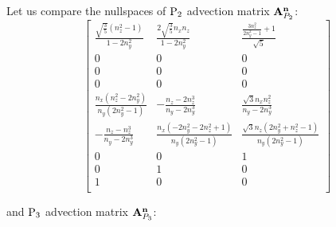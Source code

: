 \begin{remark} 
Let us compare the nullspaces of $\PN[2]$ advection matrix $\mat{A}_{P_2}^{\bn}$: 
$$
\left[
\begin{array}{ccc}
 \frac{\sqrt{\frac{3}{5}} \left(n_z^2-1\right)}{1-2 n_y^2} & \frac{2 \sqrt{\frac{3}{5}} n_x n_z}{1-2 n_y^2} & \frac{\frac{3 n_z^2}{2 n_y^2-1}+1}{\sqrt{5}} \\
 0 & 0 & 0 \\
 0 & 0 & 0 \\
 0 & 0 & 0 \\
 \frac{n_x \left(n_z^2-2 n_y^2\right)}{n_y \left(2 n_y^2-1\right)} & -\frac{n_z-2 n_z^3}{n_y-2 n_y^3} & \frac{\sqrt{3} n_x n_z^2}{n_y-2 n_y^3} \\
 -\frac{n_z-n_z^3}{n_y-2 n_y^3} & \frac{n_x \left(-2 n_y^2-2 n_z^2+1\right)}{n_y \left(2 n_y^2-1\right)} & \frac{\sqrt{3} n_z \left(2 n_y^2+n_z^2-1\right)}{n_y \left(2 n_y^2-1\right)} \\
 0 & 0 & 1 \\
 0 & 1 & 0 \\
 1 & 0 & 0 \\
\end{array}
\right]
$$

\noindent and $\PN[3]$ advection matrix $\mat{A}_{P_3}^{\bn}$:


\end{remark}
